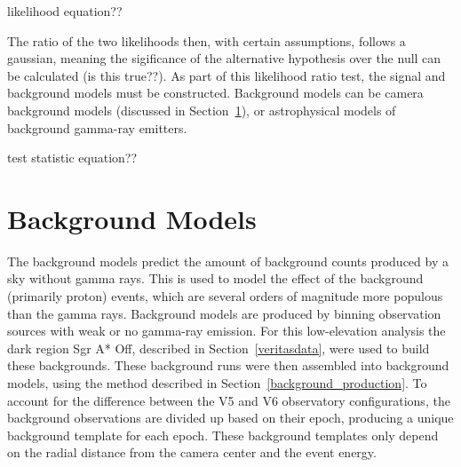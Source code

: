   {\color{red}likelihood equation??}
  
  The ratio of the two likelihoods then, with certain assumptions, follows a gaussian, meaning the sigificance of the alternative hypothesis over the null can be calculated {\color{red}(is this true??)}.
  As part of this likelihood ratio test, the signal and background models must be constructed.
  Background models can be camera background models (discussed in Section~\ref{sec:bkgmodels}), or astrophysical models of background gamma-ray emitters.

  {\color{red}test statistic equation??}

\section{Background Models}\label{sec:bkgmodels}
  The background models predict the amount of background counts produced by a sky without gamma rays.
  This is used to model the effect of the background (primarily proton) events, which are several orders of magnitude more populous than the gamma rays.
  Background models are produced by binning observation sources with weak or no gamma-ray emission.
  For this low-elevation analysis the dark region Sgr A* Off, described in Section~\ref{veritasdata}, were used to build these backgrounds.
  These background runs were then assembled into background models, using the method described in Section~\ref{background_production}.
  To account for the difference between the V5 and V6 observatory configurations, the background observations are divided up based on their epoch, producing a unique background template for each epoch.
  These background templates only depend on the radial distance from the camera center and the event energy.



